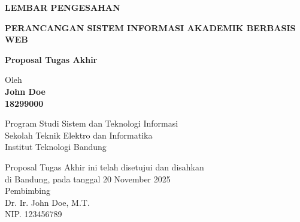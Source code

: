 \documentclass[12pt,a4paper,oneside]{book}
\begin{document}
\newpage
\thispagestyle{empty}
\begin{center}
  \textbf{\large LEMBAR PENGESAHAN}\\[1cm]
  \vspace*{1.5cm}
    
  {\large\bfseries PERANCANGAN SISTEM INFORMASI AKADEMIK BERBASIS WEB}\\
     \vspace{2cm}

  {\Large \textbf{Proposal Tugas Akhir}}\\


  \vspace{1.5cm}
    
    
  {\large Oleh}\\[0.3cm]
    \textbf{
    {\large John Doe}\\
    {\large 18299000}
  }\\
    
  \vspace{0.5cm}
 
  {\large Program Studi Sistem dan Teknologi Informasi}\\
  {\large Sekolah Teknik Elektro dan Informatika}\\
  {\large Institut Teknologi Bandung}\\

  \vspace{1.5cm}

  Proposal Tugas Akhir ini telah disetujui dan disahkan\\ 
  di Bandung, pada tanggal 20 November 2025\\[1cm]

	Pembimbing  \\[3cm]
	Dr. Ir. John Doe, M.T.   \\[0.2cm]
	NIP. 123456789 

\end{center}

\vspace{1cm}
\noindent

\end{document}
